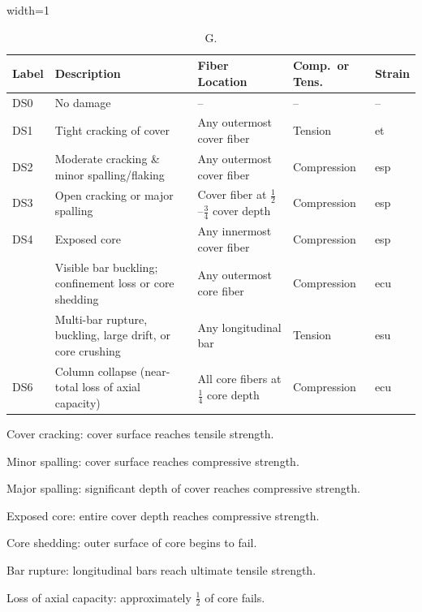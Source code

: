 \begin{table}[H]
\centering
\caption{G.}
\begin{adjustbox}{width=1\textwidth}
\begin{threeparttable}
\renewcommand{\arraystretch}{1.4}
\begin{tabular}{>{\centering\arraybackslash}m{1.2cm}
                 m{5.0cm}
                 m{3.6cm}
                 >{\centering\arraybackslash}m{2.4cm}
                 >{\centering\arraybackslash}m{1.4cm}}
\toprule
\textbf{Label} & \textbf{Description} &
\textbf{Fiber Location} & \textbf{Comp.\ or Tens.} & \textbf{Strain} \\
\midrule

DS0 & No damage & -- & -- & -- \\
DS1 & Tight cracking of cover\tnote{a} & Any outermost cover fiber & Tension & \gls{et} \\
DS2 & Moderate cracking \& minor spalling/flaking\tnote{b} & Any outermost cover fiber & Compression & \gls{esp} \\
DS3 & Open cracking or major spalling\tnote{c} & Cover fiber at $\tfrac{1}{2}$--$\tfrac{3}{4}$ cover depth & Compression & \gls{esp} \\
DS4 & Exposed core\tnote{d} & Any innermost cover fiber & Compression & \gls{esp} \\
\multirow{2}{*}{DS5}
    & Visible bar buckling; confinement loss or core shedding\tnote{e} & Any outermost core fiber & Compression & \gls{ecu} \\
    & Multi-bar rupture, buckling, large drift, or core crushing\tnote{f} & Any longitudinal bar & Tension & \gls{esu} \\
DS6 & Column collapse (near-total loss of axial capacity)\tnote{g} & All core fibers at $\tfrac{1}{4}$ core depth & Compression & \gls{ecu} \\
\bottomrule
\end{tabular}
\begin{tablenotes}\footnotesize
  \item[a] Cover cracking: cover surface reaches tensile strength.
  \item[b] Minor spalling: cover surface reaches compressive strength.
  \item[c] Major spalling: significant depth of cover reaches compressive strength.
  \item[d] Exposed core: entire cover depth reaches compressive strength.
  \item[e] Core shedding: outer surface of core begins to fail.
  \item[f] Bar rupture: longitudinal bars reach ultimate tensile strength.
  \item[g] Loss of axial capacity: approximately $\tfrac{1}{2}$ of core fails.
\end{tablenotes}
\end{threeparttable}
\end{adjustbox}
\label{tab:DS4}
\end{table}
